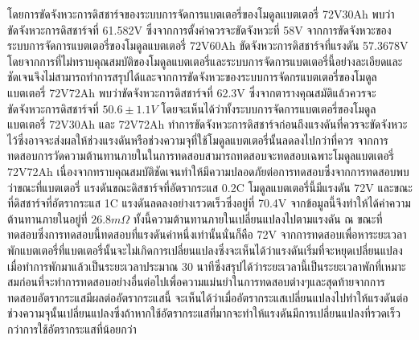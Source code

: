 โดยการขัดจังหวะการดิสชาร์จของระบบการจัดการแบตเตอรี่ของโมดูลแบตเตอรี่ 72V30Ah พบว่าขัดจังหวะการดิสชาร์จที่ 61.582V ซึ่งจากการตั้งค่าควรจะขัดจังหวะที่ 58V จากการขัดจังหวะของระบบการจัดการแบตเตอรี่ของโมดูลแบตเตอรี่ 72V60Ah ขัดจังหวะการดิสชาร์จที่แรงดัน 57.3678V โดยจากการที่ไม่ทราบคุณสมบัติของโมดูลแบตเตอรี่และระบบการจัดการแบตเตอรี่นี้อย่างละเอียดและชัดเจนจึงไม่สามารถทำการสรุปได้และจากการขัดจังหวะของระบบการจัดกรแบตเตอรี่ของโมดูลแบตเตอรี่ 72V72Ah พบว่าขัดจังหวะการดิสชาร์จที่ 62.3V ซึ่งจากตารางคุณสมัติแล้วควรจะขัดจังหวะการดิสชาร์จที่ $50.6\pm 1.1V$ โดยจะเห็นได้ว่าทั้งระบบการจัดการแบตเตอรี่ของโมดูลแบตเตอรี่ 72V30Ah และ 72V72Ah ทำการขัดจังหวะการดิสชาร์จก่อนถึงแรงดันที่ควรจะขัดจังหวะไว้ซึ่งอาจจะส่งผลให้ช่วงแรงดันหรือช่วงความจุที่ใช้โมดูลแบตเตอรี่นั้นลดลงไปกว่าที่ควร
\newline
\hspace*{2cm}
จากการทดสอบการวัดความต้านทานภายในในการทดสอบสามารถทดสอบจะทดสอบเฉพาะโมดูลแบตเตอรี่ 72V72Ah เนื่องจากทราบคุณสมบัติชัดเจนทำให้มีความปลอดภัยต่อการทดสอบซึ่งจากการทดสอบพบว่าขณะที่แบตเตอรี่
แรงดันขณะดิสชาร์จที่อัตรากระแส 0.2C โมดูลแบตเตอรี่นี้มีแรงดัน 72V และขณะที่ดิสชาร์จที่อัตรากระแส 1C แรงดันลดลงอย่างเรวดเร็วซึ่งอยู่ที่ 70.4V จากข้อมูลนี้จึงทำให้ได้ค่าความต้านทานภายในอยู่ที่
$26.8 m\Omega $ ทั้งนี้ความต้านทานภายในเปลี่ยนแปลงไปตามแรงดัน ณ ขณะที่ทดสอบซึ่งการทดสอบนี้ทดสอบที่แรงดันค่าหนึ่งเท่านั้นนั่นก็คือ 72V
\newline
\hspace*{2cm}
จากการทดสอบเพื่อหาระยะเวลาพักแบตเตอรี่ที่แบตเตอรี่นั้นจะไม่เกิดการเปลี่ยนแปลงซึ่งจะเห็นได้ว่าแรงดันเริ่มที่จะหยุดเปลี่ยนแปลงเมื่อทำการพักมาแล้วเป็นระยะเวลาประมาณ 30 นาทีซึ่งสรุปได้ว่าระยะเวลานี้เป็นระยะเวลาพักที่เหมาะสมก่อนที่จะทำการทดสอบอย่างอื่นต่อไปเพื่อความแม่นยำในการทดสอบต่างๆและสุดท้ายจากการทดสอบอัตรากระแสมีผลต่ออัตรากระแสนี้
จะเห็นได้ว่าเมื่ออัตรากระแสเปลี่ยนแปลงไปทำให้แรงดันต่อช่วงความจุนั้นเปลี่ยนแปลงซึ่งถ้าหากใช้อัตรากระแสที่มากจะทำให้แรงดันมีการเปลี่ยนแปลงที่รวดเร็วกว่าการใช้อัตรากระแสที่น้อยกว่า
